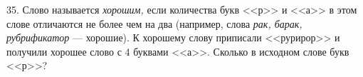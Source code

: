 35. Слово называется {\it хорошим,} если количества букв <<р>> и <<а>> в этом слове отличаются не более чем на два (например, слова {\it рак, барак, рубрификатор} --- хорошие). К хорошему слову приписали <<рурирор>> и получили хорошее слово с 4 буквами <<а>>. Сколько в исходном слове букв <<р>>?\\
